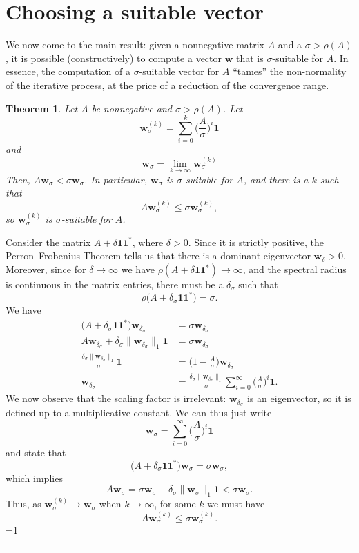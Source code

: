 \documentclass{article}
\newcommand{\w}{{\bm w}}
\newcommand{\1}{\mathbf 1}
\newtheorem{theorem}{Theorem}
\newcounter{noqed}
\newcommand{\qed}{ \ifmmode\mbox{ }\fi\rule[-.05em]{.3em}{.7em}\setcounter{noqed}{0}}
\newenvironment{proof}[1][{}]{\noindent{\bf Proof#1. }\setcounter{noqed}{1}}{\ifnum\value{noqed}=1\qed\fi\par\medskip}
\begin{document}
\section{Choosing a suitable vector}
\label{sec:choosing}

We now come to the main result: given a nonnegative matrix $A$ 
and a $\sigma>\rho(A)$, it is possible (constructively) to compute a vector
$\w$ that is $\sigma$-suitable for $A$. In essence, the
computation of a $\sigma$-suitable vector for $A$ ``tames'' the
non-normality of the iterative process, at the price of a reduction of the
convergence range.

\begin{theorem}
\label{teo:suitable}
Let $A$ be nonnegative and $\sigma>\rho(A)$. Let
\[
\w_\sigma^{(k)} = \sum_{i=0}^k \biggl(\frac A{\sigma}\biggr)^i\1
\]
and
\[
\w_\sigma =\lim_{k\to\infty}\w_\sigma^{(k)}
\]
Then, $A\w_\sigma<\sigma\w_\sigma$. In particular, $\w_\sigma$ is
$\sigma$-suitable for $A$, and there is a $k$ such that
\[
A\w_\sigma^{(k)}\leq
\sigma\w_\sigma^{(k)},
\]
so $\w_\sigma^{(k)}$ is
$\sigma$-suitable for $A$.
\end{theorem}
\begin{proof}
Consider the matrix $A+\delta\1\1^*$, where $\delta>0$. Since it is strictly
positive, the Perron--Frobenius Theorem tells us that there is a 
dominant eigenvector $\w_\delta>0$. Moreover, since for $\delta\to\infty$
we have $\rho(A+\delta\1\1^*)\to\infty$, and the spectral radius is continuous in the
matrix entries, there must be a $\delta_\sigma$ such that
\[
\rho\bigl(A+\delta_\sigma\1\1^*\bigr)=\sigma.
\]
We have
\begin{align*}
\bigl(A+\delta_\sigma\1\1^*\bigr)\w_{\delta_\sigma}&=\sigma\w_{\delta_\sigma}\\
A\w_{\delta_\sigma}+\delta_\sigma\|\w_{\delta_\sigma}\|_1\1
&=\sigma\w_{\delta_\sigma}\\
\frac{\delta_\sigma\|\w_{\delta_\sigma}\|_1}{\sigma}\1
&=\biggl(1-\frac A{\sigma}\biggr)\w_{\delta_\sigma}\\
\w_{\delta_\sigma}&=\frac{\delta_\sigma\|\w_{\delta_\sigma}\|_1}{\sigma}\sum_{i=0}^\infty\biggl(\frac
A{\sigma}\biggr)^i \1.
\end{align*}
We now observe that the scaling factor is irrelevant: $\w_{\delta_\sigma}$ is an
eigenvector, so it is defined up to a multiplicative constant. We can thus just write
\[
\w_\sigma =\sum_{i=0}^\infty\biggl(\frac
A{\sigma}\biggr)^i \1
\]
and state that
\[
\bigl(A+\delta_\sigma\1\1^*\bigr)\w_\sigma =\sigma\w_\sigma,
\]
which implies
\[
A\w_\sigma =\sigma\w_\sigma  - \delta_\sigma\|\w_\sigma\|_1\1<\sigma\w_\sigma.
\]
Thus, as $\w_\sigma^{(k)}\to \w_\sigma$ when $k\to \infty$, for some
$k$ we must have
\[
A\w_\sigma ^{(k)}\leq\sigma\w_\sigma ^{(k)}.
\]
\end{proof}
\end{document}
